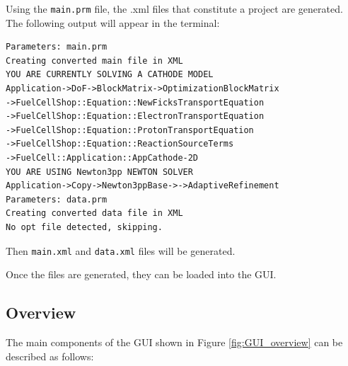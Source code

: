 Using the \texttt{main.prm} file, the .xml files that constitute a project are generated. The following output will appear in the terminal:
\begin{lstlisting}
Parameters: main.prm
Creating converted main file in XML
YOU ARE CURRENTLY SOLVING A CATHODE MODEL
Application->DoF->BlockMatrix->OptimizationBlockMatrix
->FuelCellShop::Equation::NewFicksTransportEquation
->FuelCellShop::Equation::ElectronTransportEquation
->FuelCellShop::Equation::ProtonTransportEquation
->FuelCellShop::Equation::ReactionSourceTerms
->FuelCell::Application::AppCathode-2D
YOU ARE USING Newton3pp NEWTON SOLVER
Application->Copy->Newton3ppBase->->AdaptiveRefinement
Parameters: data.prm
Creating converted data file in XML
No opt file detected, skipping.
\end{lstlisting}
Then \texttt{main.xml} and \texttt{data.xml} files will be generated.
 
Once the files are generated, they can be loaded into the GUI.

\subsection{Overview}
% 

The main components of the GUI shown in Figure \ref{fig:GUI_overview} can be described as follows:

